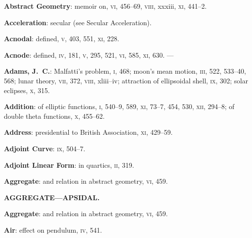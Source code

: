 \documentclass[11pt,a4paper]{book}
\begin{document}
\vspace{0.4em}
\textbf{Abstract Geometry}: memoir on, \textsc{vi}, 456--69, \textsc{viii}, xxxiii, \textsc{xi}, 441--2.

\vspace{0.4em}
\textbf{Acceleration}: secular (see Secular Acceleration).

\vspace{0.4em}
\textbf{Acnodal}: defined, \textsc{v}, 403, 551, \textsc{xi}, 228.

\vspace{0.4em}
\textbf{Acnode}: defined, \textsc{iv}, 181, \textsc{v}, 295, 521, \textsc{vi}, 585, \textsc{xi}, 630. ---

\vspace{0.4em}
\textbf{Adams, J.~C.}: Malfatti's problem, \textsc{i}, 468; moon's mean motion, \textsc{iii}, 522, 533--40, 568; lunar theory, \textsc{vii}, 372, \textsc{viii}, xliii--iv; attraction of ellipsoidal shell, \textsc{ix}, 302; solar eclipses, \textsc{x}, 315.

\vspace{0.4em}
\textbf{Addition}: of elliptic functions, \textsc{i}, 540--9, 589, \textsc{xi}, 73--7, 454, 530, \textsc{xii}, 294--8; of double theta functions, \textsc{x}, 455--62.

\vspace{0.4em}
\textbf{Address}: presidential to British Association, \textsc{xi}, 429--59.

\vspace{0.4em}
\textbf{Adjoint Curve}: \textsc{ix}, 504--7.

\vspace{0.4em}
\textbf{Adjoint Linear Form}: in quartics, \textsc{ii}, 319.

\vspace{0.4em}
\textbf{Aggregate}: and relation in abstract geometry, \textsc{vi}, 459.

\newpage
\thispagestyle{fancy}

\begin{center}
\textbf{AGGREGATE---APSIDAL.}
\end{center}
\vspace{0.5em}

\textbf{Aggregate}: and relation in abstract geometry, \textsc{vi}, 459.

\vspace{0.4em}
\textbf{Air}: effect on pendulum, \textsc{iv}, 541.
\end{document}
